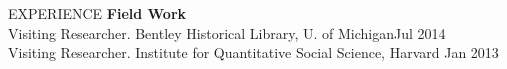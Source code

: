 \documentclass {resume}
\begin{document}
\begin{rSection}{\textrm{EXPERIENCE}}
{\large \textbf{Field Work}}\\
Visiting Researcher. Bentley Historical Library, U. of Michigan\hfill Jul 2014\smallskip\\
Visiting Researcher. Institute for Quantitative Social Science, Harvard \hfill Jan 2013%
\end{rSection}%
\end{document}
